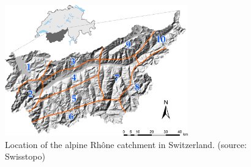 \documentclass[twocol]{ametsoc}
\begin{document}
\clearpage



%


\begin{figure}[htb]
	\centerline{\includegraphics[width=7.9cm]{figures/figure_map.pdf}}
	\caption{Location of the alpine Rh\^{o}ne catchment in Switzerland. (source: Swisstopo)}
	\label{fig:map}
\end{figure}
\end{document}
